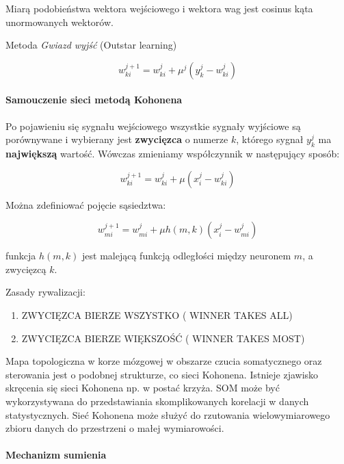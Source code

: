Miarą podobieństwa wektora wejściowego i wektora wag jest cosinus kąta unormowanych wektorów.

Metoda \textit{Gwiazd wyjść} (Outstar learning)

\begin{equation}
 w_{ki}^{j+1} = w_{ki}^j + \mu^j (y_k^j - w_{ki}^j)
\end{equation}

\paragraph{Samouczenie sieci metodą Kohonena}

Po pojawieniu się sygnału wejściowego wszystkie sygnały wyjściowe są porównywane i wybierany jest
\textbf{zwycięzca} o numerze $k$, którego sygnał $y_k^j$ ma \textbf{największą} wartość. Wówczas
zmieniamy współczynnik w następujący sposób:

\begin{equation}
 w_{ki}^{j+1} = w_{ki}^j + \mu (x_i^j - w_{ki}^j)
\end{equation}

Można zdefiniować pojęcie sąsiedztwa:

\begin{equation}
 w_{mi}^{j+1} = w_{mi}^j + \mu h(m,k) (x_i^j - w_{mi}^j)
\end{equation}

funkcja $h(m,k)$ jest malejącą funkcją odległości między neuronem $m$, a zwycięzcą $k$.

Zasady rywalizacji:
\begin{enumerate}
 \item ZWYCIĘZCA BIERZE WSZYSTKO ( WINNER TAKES ALL)
 \item ZWYCIĘZCA BIERZE WIĘKSZOŚĆ ( WINNER TAKES MOST)
\end{enumerate}

Mapa topologiczna w korze mózgowej w obszarze czucia somatycznego oraz sterowania jest o podobnej 
strukturze, co sieci Kohonena.
Istnieje zjawisko skręcenia się sieci Kohonena np. w postać krzyża.
SOM może być wykorzystywana do przedstawiania skomplikowanych korelacji w danych statystycznych.
Sieć Kohonena może służyć do rzutowania wielowymiarowego zbioru danych do przestrzeni o małej wymiarowości.

\paragraph{Mechanizm sumienia}

